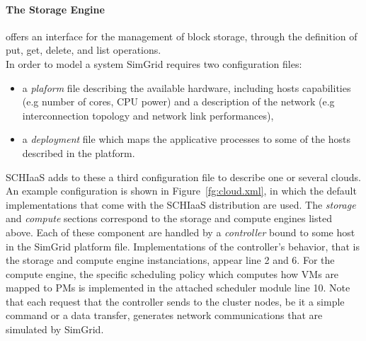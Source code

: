 \paragraph{The Storage  Engine}  offers  an interface  for  the  management of  block
  storage, through the definition of put, get, delete, and list operations.\\

\noindent %
In order to model a system SimGrid requires two configuration files: 
\begin{itemize}
\item a \emph{plaform}  file describing the available  hardware, including hosts
  capabilities (e.g number of cores, CPU power) and a description of the network
  (e.g interconnection topology and network link performances),
\item a \emph{deployment} file which maps the applicative processes to some of
  the hosts described in the platform.
\end{itemize}

SCHIaaS adds  to these  a third  configuration file to  describe one  or several
clouds.   An example  configuration  is shown  in Figure~\ref{fg:cloud.xml},  in
which the  default implementations that  come with the SCHIaaS  distribution are
used.  The \emph{storage} and \emph{compute}  sections correspond to the storage
and compute  engines listed  above.  Each  of these component  are handled  by a
\emph{controller}   bound  to   some  host   in  the   SimGrid  platform   file.
Implementations of  the controller's behavior,  that is the storage  and compute
engine  instanciations, appear  line  2  and 6.   For  the  compute engine,  the
specific  scheduling  policy  which  computes  how VMs  are  mapped  to  PMs  is
implemented in  the attached scheduler module  line 10.  Note that  each request
that the controller sends to the cluster nodes, be it a simple command or a data
transfer, generates network communications that are simulated by SimGrid.

